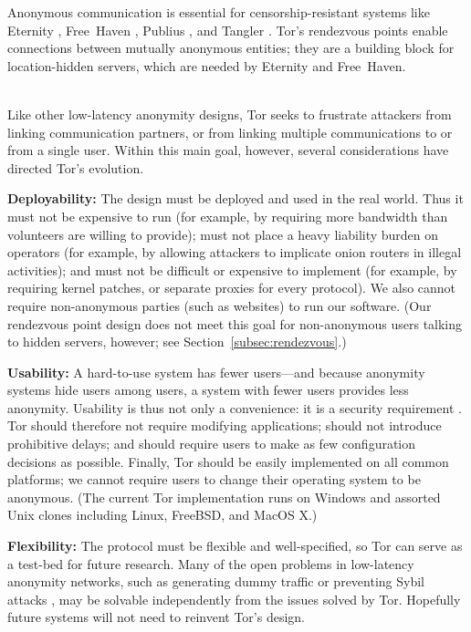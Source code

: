 \documentclass[times,10pt,twocolumn]{article}
\begin{document}
Anonymous communication is essential for censorship-resistant
systems like Eternity \cite{eternity}, Free~Haven \cite{freehaven-berk},
Publius \cite{publius}, and Tangler \cite{tangler}. Tor's rendezvous
points enable connections between mutually anonymous entities; they
are a building block for location-hidden servers, which are needed by
Eternity and Free~Haven.


\label{sec:assumptions}

\\
Like other low-latency anonymity designs, Tor seeks to frustrate
attackers from linking communication partners, or from linking
multiple communications to or from a single user.  Within this
main goal, however, several considerations have directed
Tor's evolution.

\textbf{Deployability:} The design must be deployed and used in the
real world.  Thus it
must not be expensive to run (for example, by requiring more bandwidth
than volunteers are willing to provide); must not place a heavy
liability burden on operators (for example, by allowing attackers to
implicate onion routers in illegal activities); and must not be
difficult or expensive to implement (for example, by requiring kernel
patches, or separate proxies for every protocol).  We also cannot
require non-anonymous parties (such as websites)
to run our software.  (Our rendezvous point design does not meet
this goal for non-anonymous users talking to hidden servers,
however; see Section~\ref{subsec:rendezvous}.)

\textbf{Usability:} A hard-to-use system has fewer users---and because
anonymity systems hide users among users, a system with fewer users
provides less anonymity.  Usability is thus not only a convenience:
it is a security requirement \cite{econymics,back01}. Tor should
therefore not
require modifying applications; should not introduce prohibitive delays;
and should require users to make as few configuration decisions
as possible.  Finally, Tor should be easily implemented on all common
platforms; we cannot require users to change their operating system
to be anonymous.  (The current Tor implementation runs on Windows and
assorted Unix clones including Linux, FreeBSD, and MacOS X.)

\textbf{Flexibility:} The protocol must be flexible and well-specified,
so Tor can serve as a test-bed for future research.
Many of the open problems in low-latency anonymity
networks, such as generating dummy traffic or preventing Sybil attacks
\cite{sybil}, may be solvable independently from the issues solved by
Tor. Hopefully future systems will not need to reinvent Tor's design.
\end{document}
